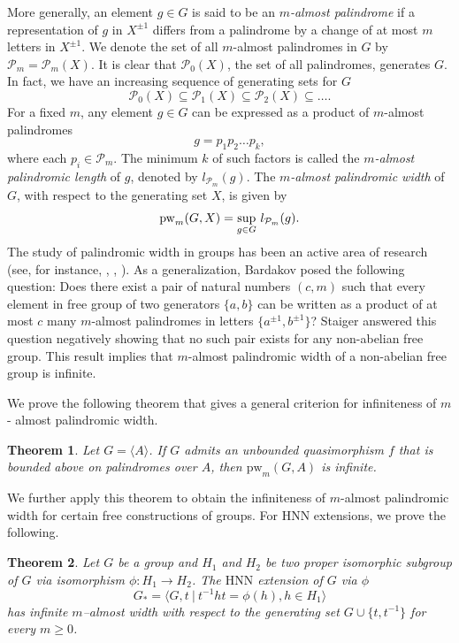 \documentclass[12pt]{amsart}
\newtheorem{theorem}{Theorem}[section]
\theoremstyle{definition}
\theoremstyle{remark}
\numberwithin{equation}{subsection}
\theoremstyle{plain}
\numberwithin{equation}{section}
\begin{document}
More generally, an element $g \in G$ is said to be an {\it $m$-almost palindrome} if a representation of $g$ in $X^{\pm 1}$ differs from a palindrome by a change of at most $m$ letters in $X^{\pm 1}$. We denote the set of all $m$-almost palindromes in
$G$ by $\mathcal{P}_m = \mathcal{P}_m(X)$. It is clear that $\mathcal{P}_0(X)$, the set of all palindromes, generates $G$. In fact, we have an increasing sequence of generating sets for $G$ $$\mathcal{P}_0(X) \subseteq \mathcal{P}_1(X) \subseteq \mathcal{P}_2(X) \subseteq \ldots .$$ For a fixed $m$, any element $g \in G$ can be expressed as a product of $m$-almost palindromes
$$
g = p_1 p_2 \ldots p_k,
$$
where each $p_i \in \mathcal{P}_m$. The minimum $k$ of such factors is called the \emph{$m$-almost palindromic length} of $g$, denoted by $l_{\mathcal{P}_m}(g)$.  The \emph{$m$-almost palindromic width} of $G$, with respect to the generating set $X$, is given by
$$
{\rm pw}_m(G,X)= \underset{g \in G}{\sup} \ l_{\mathcal{P}_m}(g).
$$
The study of palindromic width in groups has been an active area of research (see, for instance, \cite{BST,BT}, \cite{BG,BG2,BG3}, \cite{fi}). As a generalization, Bardakov \cite[Problem~19.8]{KN} posed the following question: Does there exist a pair of natural numbers $(c,m)$ such that every element in free group of two generators $\{a,b\}$ can be written as a product of at most $c$ many $m$-almost palindromes in letters $\{a^{\pm 1}, b^{\pm 1} \}$? Staiger \cite{MS} answered this question negatively showing that no such pair exists for any non-abelian free group. This result implies that $m$-almost palindromic width of a non-abelian free group is infinite. 


We prove the following theorem that gives a general criterion for infiniteness of $m$- almost palindromic width.  

\begin{theorem}\label{main}
    Let $G = \langle A \rangle$. If $G$ admits an unbounded quasimorphism $f$ that is bounded above on palindromes over $A$, then $\mathrm{pw}_m(G, A)$ is infinite.
\end{theorem}

We further apply this theorem to obtain the infiniteness of $m$-almost palindromic width for certain free constructions of groups. For  $\mathrm{HNN}$ extensions, we prove the following.
\begin{theorem}\label{HNN}
    Let $G$ be a group and $H_1$ and $H_2$ be two proper isomorphic subgroup of $G$ via isomorphism $\phi: H_1 \longrightarrow H_2$. The $\mathrm{HNN}$ extension of $G$ via $\phi$
    $$G_* = \langle G, t ~\vert ~ t^{-1}ht = \phi(h), h \in H_1 \rangle$$
    has infinite $m$--almost width with respect to the generating set $G \cup \{t,t^{-1}\}$ for every $m \geq 0$.
\end{theorem}
\end{document}
